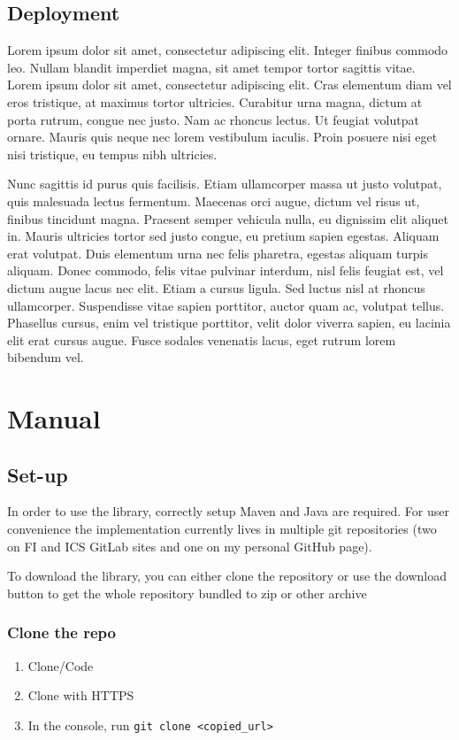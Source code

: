 \documentclass[
  digital,     %
  oneside,     %
  nosansbold,  %
  nocolorbold, %
  lof,         %
  lot,         %
]{fithesis4}
\begin{document}
\section{Deployment}
Lorem ipsum dolor sit amet, consectetur adipiscing elit. Integer finibus commodo leo. Nullam blandit imperdiet magna, sit amet tempor tortor sagittis vitae. Lorem ipsum dolor sit amet, consectetur adipiscing elit. Cras elementum diam vel eros tristique, at maximus tortor ultricies. Curabitur urna magna, dictum at porta rutrum, congue nec justo. Nam ac rhoncus lectus. Ut feugiat volutpat ornare. Mauris quis neque nec lorem vestibulum iaculis. Proin posuere nisi eget nisi tristique, eu tempus nibh ultricies.

Nunc sagittis id purus quis facilisis. Etiam ullamcorper massa ut justo volutpat, quis malesuada lectus fermentum. Maecenas orci augue, dictum vel risus ut, finibus tincidunt magna. Praesent semper vehicula nulla, eu dignissim elit aliquet in. Mauris ultricies tortor sed justo congue, eu pretium sapien egestas. Aliquam erat volutpat. Duis elementum urna nec felis pharetra, egestas aliquam turpis aliquam. Donec commodo, felis vitae pulvinar interdum, nisl felis feugiat est, vel dictum augue lacus nec elit. Etiam a cursus ligula. Sed luctus nisl at rhoncus ullamcorper. Suspendisse vitae sapien porttitor, auctor quam ac, volutpat tellus. Phasellus cursus, enim vel tristique porttitor, velit dolor viverra sapien, eu lacinia elit erat cursus augue. Fusce sodales venenatis lacus, eget rutrum lorem bibendum vel.

\chapter{Manual}
\section{Set-up}
In order to use the library, correctly setup Maven and Java are required. For user convenience
the implementation currently lives in multiple git repositories (two on FI and ICS GitLab sites
and one on my personal GitHub page).

To download the library, you can either clone the repository or use the download button to get the
whole repository bundled to zip or other archive
\subsection{Clone the repo}
\begin{enumerate}
  \item Clone/Code
  \item Clone with HTTPS
  \item In the console, run \verb|git clone <copied_url>|
\end{enumerate}
\end{document}
